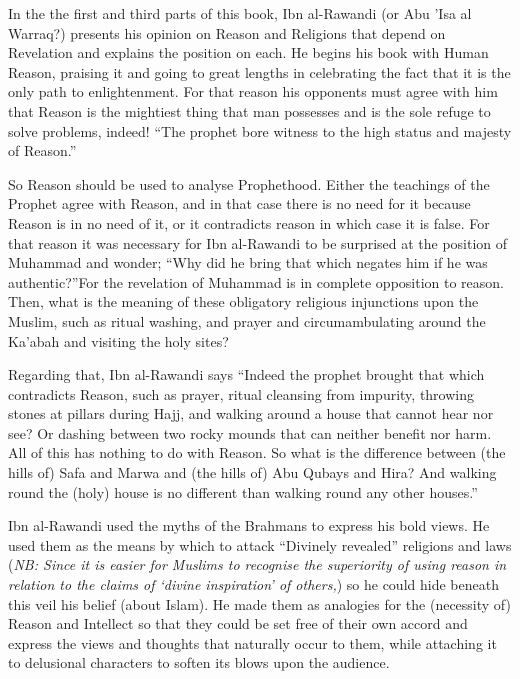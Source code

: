 \documentclass[12pt]{book}
\newcommand{\NB}[1]{\emph{NB: #1}}
\begin{document}

In the the first and third parts of this book, Ibn al-Rawandi (or Abu ’Isa al
Warraq?) presents his opinion on Reason and Religions that depend on Revelation
and explains the position on each. He begins his book with Human Reason,
praising it and going to great lengths in celebrating the fact that it is the
only path to enlightenment. For that reason his opponents must agree with him
that Reason is the mightiest thing that man possesses and is the sole refuge to
solve problems, indeed! “The prophet bore witness to the high status and
majesty of Reason.”\footnotemark


So Reason should be used to analyse Prophethood. Either the teachings of the
Prophet agree with Reason, and in that case there is no need for it because
Reason is in no need of it, or it contradicts reason in which case it is false.
For that reason it was necessary for Ibn al-Rawandi to be surprised at the
position of Muhammad and wonder; “Why did he bring that which negates him if he
was authentic?”\footnotemark For the revelation of Muhammad is in complete
opposition to reason. Then, what is the meaning of these obligatory religious
injunctions upon the Muslim, such as ritual washing, and prayer and
circumambulating around the Ka’abah and visiting the holy sites?


Regarding that, Ibn al-Rawandi says “Indeed the prophet brought that which
contradicts Reason, such as prayer, ritual cleansing from impurity, throwing
stones at pillars during Hajj, and walking around a house that cannot hear nor
see? Or dashing between two rocky mounds that can neither benefit nor harm. All
of this has nothing to do with Reason. So what is the difference between (the
hills of) Safa and Marwa and (the hills of) Abu Qubays and Hira? And walking
round the (holy) house is no different than walking round any other
houses.”\footnotemark


Ibn al-Rawandi used the myths of the Brahmans to express his bold views.
He used them as the means by which to attack
“Divinely revealed” religions and laws
(\NB{Since it is easier for Muslims to recognise the superiority of using
reason in relation to the claims of ‘divine inspiration’ of others,})
so he could hide beneath this veil his belief (about Islam).
He made them as
analogies for the (necessity of) Reason and Intellect so that they could be set
free of their own accord and express the views and thoughts that naturally
occur to them, while attaching it to delusional characters to soften its blows
upon the audience.
\end{document}
